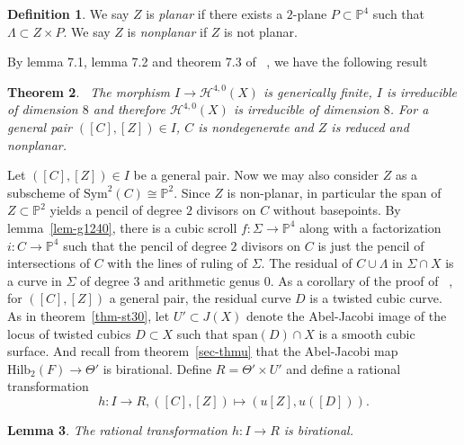 \documentclass[amssymb,twoside,12 pt,amscd,reqno]{amsart}
\theoremstyle{plain}
\newtheorem{thm}{Theorem}[section]
\newtheorem{lem}[thm]{Lemma}
\theoremstyle{definition}
\newtheorem{defn}[thm]{Definition}
\newcommand{\Hdg}[2]{\mathcal{H}^{#1,#2}}
\newcommand{\PP}{\mathbb{P}}
\newcommand{\HI}[2]{\text{Hilb}_{#1}(#2)}
\newcommand{\lt}{\left}
\newcommand{\rt}{\right}
\begin{document}
\begin{defn} We say $Z$ is \emph{planar} if there exists a $2$-plane
$P\subset \PP^4$ such that $\Lambda\subset Z\times P$.  We say $Z$ is
\emph{nonplanar} if $Z$ is not planar.
\end{defn}

By lemma 7.1, lemma 7.2 and theorem 7.3 of ~\cite{HRS1}, we have
the following result

\begin{thm}~\label{thm-irr40} 
The morphism $I\rightarrow \Hdg{4}{0}(X)$ is generically
finite, $I$ is irreducible of dimension $8$ and therefore
$\Hdg{4}{0}(X)$ is irreducible of dimension $8$.  For a general pair
$([C],[Z])\in I$, $C$ is nondegenerate and $Z$ is reduced and nonplanar.
\end{thm}


Let $([C],[Z])\in I$ be a general pair.
Now we may also consider $Z$ as a subscheme of
$\text{Sym}^2(C)\cong\PP^2$.  Since $Z$ is non-planar, in particular
the span of $Z\subset \PP^2$ yields a pencil of degree $2$ divisors on
$C$ without basepoints.  By lemma~\ref{lem-g1240}, there is a cubic
scroll $f:\Sigma\rightarrow\PP^4$ along with a factorization
$i:C\rightarrow\PP^4$ such that the pencil of degree $2$ divisors on
$C$ is just the pencil of intersections of $C$ with the lines of
ruling of $\Sigma$.  The residual of $C\cup \Lambda$ in $\Sigma\cap X$
is a curve in $\Sigma$ of degree $3$ and arithmetic genus $0$.  As a
corollary of the proof of ~\cite[theorem 7.3]{HRS1}, for $([C],[Z])$
a general pair, the residual curve $D$ is a twisted cubic curve.
As in theorem~\ref{thm-st30}, let $U'\subset J(X)$ denote the
Abel-Jacobi image of the locus of twisted cubics $D\subset X$ such
that $\text{span}(D)\cap X$ is a smooth cubic surface.  And recall
from theorem~\ref{sec-thmu} that the Abel-Jacobi map
$\HI{2}{F}\rightarrow \Theta'$ is birational.  Define $R=\Theta'\times
U'$ and define a rational transformation 
\begin{equation}
h:I\rightarrow R, \lt([C],[Z]\rt)\mapsto (u[Z],u([D])).
\end{equation}

\begin{lem}  The rational transformation $h:I\rightarrow R$ is
birational.
\end{lem}
\end{document}

